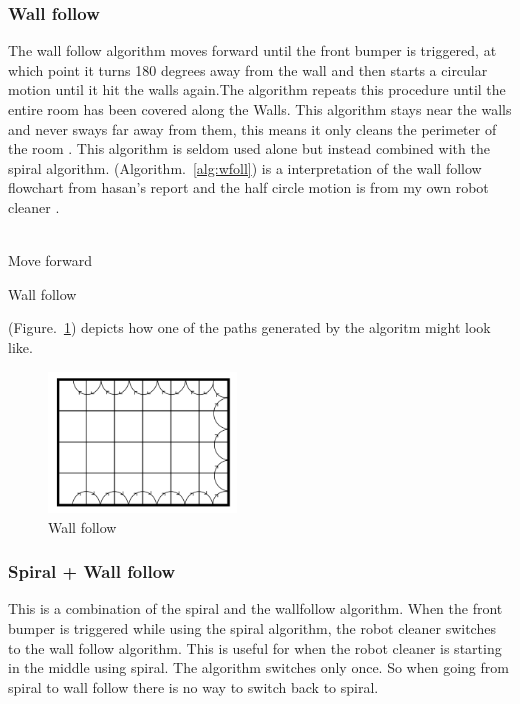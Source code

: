 \documentclass[bachelor]{kththesis}
\begin{document}
\subsubsection{Wall follow}
The wall follow algorithm moves forward until the front bumper is
triggered, at which point it turns 180 degrees away from the wall and then starts a circular motion until it hit the walls again.The algorithm repeats this procedure until the entire room has been covered along the Walls. This algorithm stays near the walls and never sways far away from them, this means it only cleans the perimeter of the room \parencite{hasan}. 
This algorithm is seldom used alone but instead combined with the spiral algorithm. 
(Algorithm.~\ref{alg:wfoll}) is a interpretation of the wall follow flowchart from hasan's report \parencite{hasan} and the half circle motion is from my own robot cleaner \parencite{centurion}.
\\\\
\begin{algorithm}[H]
	\SetAlgoLined
	Move forward
	
	
	\caption{Wall follow}
	\label{alg:wfoll}
	
\end{algorithm}
\bigskip
\noindent (Figure.~\ref{fig:wfoll}) depicts how one of the paths generated by the algoritm might look like.
\begin{figure}[H]
	\includegraphics[width=5cm]{img/wfoll.png}
	\centering
	\caption{Wall follow}
	\label{fig:wfoll}
\end{figure}
\subsubsection{Spiral + Wall follow}
This is a combination of the spiral and the wallfollow algorithm. When the front bumper is triggered while using the spiral algorithm, the robot cleaner switches to the wall follow algorithm. This is useful for when the robot cleaner is starting in the middle using spiral. The algorithm switches only once. So when going from spiral to wall follow there is no way to switch back to spiral.
\end{document}

